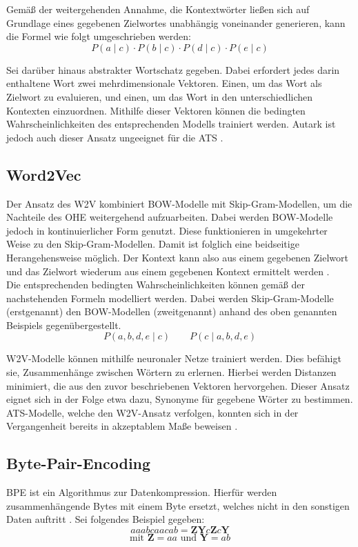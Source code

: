 \noindent
Gemäß der weitergehenden Annahme, die Kontextwörter ließen sich auf Grundlage eines gegebenen Zielwortes unabhängig voneinander generieren, kann die Formel wie folgt umgeschrieben werden: $$P(a \mid c) \cdot P(b \mid c) \cdot P(d \mid c) \cdot P(e \mid c)$$
\newpage

\noindent
Sei darüber hinaus abstrakter Wortschatz gegeben. Dabei erfordert jedes darin enthaltene Wort zwei mehrdimensionale Vektoren. Einen, um das Wort als Zielwort zu evaluieren, und einen, um das Wort in den unterschiedlichen Kontexten einzuordnen. Mithilfe dieser Vektoren können die bedingten Wahrscheinlichkeiten des entsprechenden Modells trainiert werden. Autark ist jedoch auch dieser Ansatz ungeeignet für die \ac{ATS} \cite[S.~641]{ZHA20}.


\subsection{Word2Vec}
\noindent
Der Ansatz des \ac{W2V} kombiniert \ac{BOW}-Modelle mit Skip-Gram-Modellen, um die Nachteile des \ac{OHE} weitergehend aufzuarbeiten. Dabei werden \ac{BOW}-Modelle jedoch in kontinuierlicher Form genutzt. Diese funktionieren in umgekehrter Weise zu den Skip-Gram-Modellen. Damit ist folglich eine beidseitige Herangehensweise möglich. Der Kontext kann also aus einem gegebenen Zielwort und das Zielwort wiederum aus einem gegebenen Kontext ermittelt werden \cite[S.~644]{ZHA20}.\\

\noindent
Die entsprechenden bedingten Wahrscheinlichkeiten können gemäß der nachstehenden Formeln modelliert werden. Dabei werden Skip-Gram-Modelle (erstgenannt) den \ac{BOW}-Modellen (zweitgenannt) anhand des oben genannten Beispiels gegenübergestellt. $$P(a, b, d, e \mid c) \qquad P(c \mid a, b, d, e)$$

\noindent
\ac{W2V}-Modelle können mithilfe neuronaler Netze trainiert werden. Dies befähigt sie, Zusammenhänge zwischen Wörtern zu erlernen. Hierbei werden Distanzen minimiert, die aus den zuvor beschriebenen Vektoren hervorgehen. Dieser Ansatz eignet sich in der Folge etwa dazu, Synonyme für gegebene Wörter zu bestimmen. \ac{ATS}-Modelle, welche den \ac{W2V}-Ansatz verfolgen, konnten sich in der Vergangenheit bereits in akzeptablem Maße beweisen \cite{KAR18}.


\subsection{Byte-Pair-Encoding}
\noindent
\ac{BPE} ist ein Algorithmus zur Datenkompression. Hierfür werden zusammenhängende Bytes mit einem Byte ersetzt, welches nicht in den sonstigen Daten auftritt \cite[S.~24]{NIT19}. Sei folgendes Beispiel gegeben: $$aaabcaacab = \boldsymbol{Z}\boldsymbol{Y}c\boldsymbol{Z}c\boldsymbol{Y}$$ $$\text{mit } \boldsymbol{Z} = aa \text{ und } \boldsymbol{Y} = ab$$

